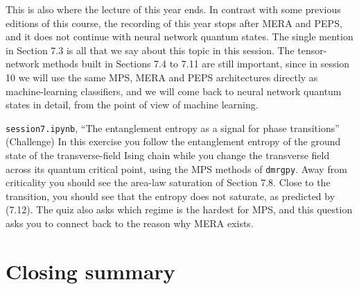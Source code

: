 

This is also where the lecture of this year ends. In contrast with some previous editions of this
course, the recording of this year stops after MERA and PEPS, and it does not continue with neural
network quantum states. The single mention in Section 7.3 is all that we say about this topic in this
session. The tensor-network methods built in Sections 7.4 to 7.11 are still important,
since in session 10 we will use the same MPS, MERA and PEPS architectures directly as
machine-learning classifiers, and we will come back to neural network quantum states in detail, from
the point of view of machine learning.

\begin{notebookbox}{\texttt{session7.ipynb}, ``The entanglement entropy as a signal for phase transitions'' (Challenge)}
In this exercise you follow the entanglement entropy of the ground state of the transverse-field Ising
chain while you change the transverse field across its quantum critical point, using the MPS methods
of \texttt{dmrgpy}. Away from criticality you should see the area-law saturation of Section 7.8. Close
to the transition, you should see that the entropy does not saturate, as predicted by (7.12). The quiz
also asks which regime is the hardest for MPS, and this question asks you to connect back to the
reason why MERA exists.
\end{notebookbox}

\section{Closing summary}


